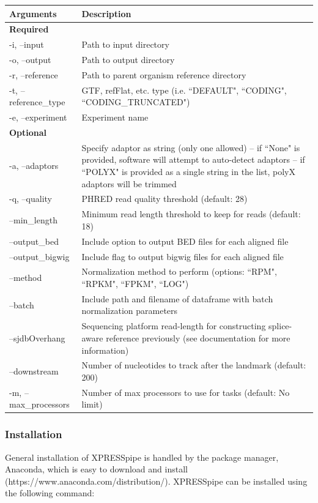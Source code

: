 \documentclass[11pt, a4paper, oneside]{article}
\begin{document}
\begin{tabular}{p{5cm}p{13cm}}
 \textbf{Arguments} & \textbf{Description} \\
 \hline
 \textbf{Required} & \\
 \hline
 -i, --input & Path to input directory \\
 \hline
 -o, --output & Path to output directory \\
 \hline
 -r, --reference & Path to parent organism reference directory \\
 \hline
 -t, --reference\_type & GTF, refFlat, etc. type (i.e. ``DEFAULT", ``CODING", ``CODING\_TRUNCATED") \\
 \hline
 -e, --experiment & Experiment name \\
 \hline
 \textbf{Optional} & \\
 \hline
 -a, --adaptors & Specify adaptor as string (only one allowed) -- if ``None" is provided, software will attempt to auto-detect adaptors -- if ``POLYX" is provided as a single string in the list, polyX adaptors will be trimmed \\
 \hline
 -q, --quality & PHRED read quality threshold (default: 28) \\
 \hline
 --min\_length & Minimum read length threshold to keep for reads (default: 18) \\
 \hline
 --output\_bed & Include option to output BED files for each aligned file \\
 \hline
 --output\_bigwig & Include flag to output bigwig files for each aligned file \\
 \hline
 --method & Normalization method to perform (options: ``RPM", ``RPKM", ``FPKM", ``LOG") \\
 \hline
 --batch & Include path and filename of dataframe with batch normalization parameters \\
 \hline
 --sjdbOverhang & Sequencing platform read-length for constructing splice-aware reference previously (see documentation for more information) \\
 \hline
 --downstream & Number of nucleotides to track after the landmark (default: 200) \\
 \hline
 -m, --max\_processors & Number of max processors to use for tasks (default: No limit) \\
\end{tabular}
\newline

\subsubsection{Installation}
General installation of XPRESSpipe is handled by the package manager, Anaconda{}, which is easy to download and install (https://www.anaconda.com/distribution/). XPRESSpipe can be installed using the following command:
\newline
\end{document}
